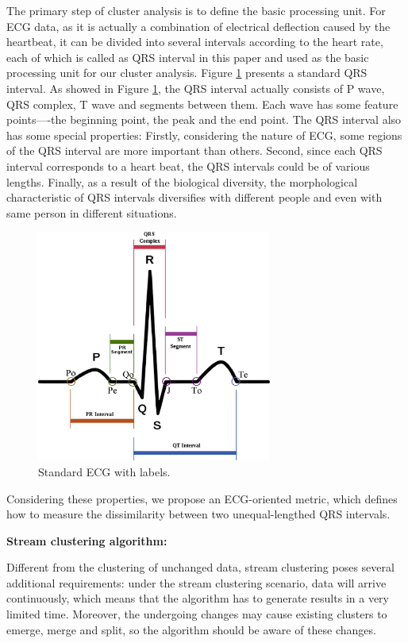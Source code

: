 \documentclass[conference]{IEEEtran}
\begin{document}
The primary step of cluster analysis is to define the basic processing unit. For ECG data, as it is actually a combination of electrical deflection caused by the heartbeat, it can be divided into several intervals according to the heart rate, each of which is called as QRS interval in this paper and used as the basic processing unit for our cluster analysis. Figure \ref{fig_ECG_lable} presents a standard QRS interval. As showed in Figure \ref{fig_ECG_lable}, the QRS interval actually consists of P wave, QRS complex, T wave and segments between them. Each wave has some feature points----the beginning point, the peak and the end point. The QRS interval also has some special properties: Firstly, considering the nature of ECG, some regions of the QRS interval are more important than others. Second, since each QRS interval corresponds to a heart beat, the QRS intervals could be of various lengths. Finally, as a result of the biological diversity, the morphological characteristic of QRS intervals diversifies with different people and even with same person in different situations.
\begin{figure}[!t]
\centering
\includegraphics[height=3.0in]{./Figure/rr_interval_label.eps}
\caption{Standard ECG with labels.}
\label{fig_ECG_lable}
\end{figure}


Considering these properties, we propose an ECG-oriented metric, which defines how to measure the dissimilarity between two unequal-lengthed QRS intervals.


\textbf{Stream clustering algorithm:}


Different from the clustering of unchanged data, stream clustering poses several additional requirements: under the stream clustering scenario, data will arrive continuously, which means that the algorithm has to generate results in a very limited time. Moreover, the undergoing changes may cause existing clusters to emerge, merge and split, so the algorithm should be aware of these changes.
\end{document}
